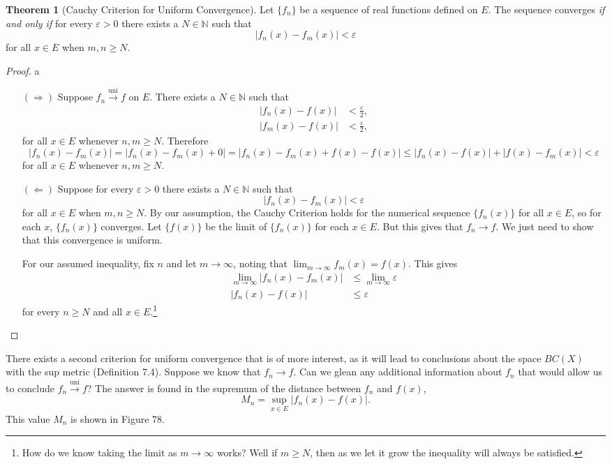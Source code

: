 \documentclass{article}
\newcommand{\N}{\mathbb{N}}
\newcommand{\uni}{\overset{\text{uni}}{\to}}
\theoremstyle{definition}
\newtheorem{theorem}{Theorem}[section]
\begin{document}
	\begin{theorem}[Cauchy Criterion for Uniform Convergence]
		Let $ \{f_n\} $ be a sequence of real functions defined on $ E $. The sequence converges \textit{if and only if} for every $ \varepsilon>0 $ there exists a $ N\in \N $ such that
		$$|f_n(x)-f_m(x)|<\varepsilon $$ for all $ x\in E $ when $ m,n\ge N $. 
	\end{theorem}
	\begin{proof}{\color{white}a}
		\begin{enumerate}
			\item [$ (\Longrightarrow) $] Suppose $ f_n\uni f $ on $ E $. There exists a $ N\in\N $ such that \begin{align*}
				|f_n(x)-f(x)|&<\frac{\varepsilon}{2},\\
				|f_m(x)-f(x)|&<\frac{\varepsilon}{2},
			\end{align*}
			for all $ x\in E $ whenever $ n,m\ge N $. Therefore $$|f_n(x)-f_m(x)|=|f_n(x)-f_m(x)+0|=|f_n(x)-f_m(x)+f(x)-f(x)|\le |f_n(x)-f(x)|+|f(x)-f_m(x)|<\varepsilon $$ for all $ x\in E $ whenever $ n,m\ge N $. 
			\item [$ (\Longleftarrow) $]  Suppose for every $ \varepsilon>0 $ there exists a $ N\in \N $ such that
			$$|f_n(x)-f_m(x)|<\varepsilon $$ for all $ x\in E $ when $ m,n\ge N $. By our assumption, the Cauchy Criterion holds for the numerical sequence $ \{f_n(x)\} $ for all $ x\in E $, so for each $ x $, $ \{f_n(x)\} $ converges. Let $ \{f(x)\} $ be the limit of $ \{f_n(x)\} $ for each $ x\in E $. But this gives that $ f_n\to f $. We just need to show that this convergence is uniform. 
			
			For our assumed inequality, fix $ n $ and let $ m\to \infty $, noting that $ \lim_{m\to \infty}f_m(x)=f(x) $. This gives 
			\begin{align*}
				\lim_{m\to\infty}|f_n(x)-f_m(x)|&\le \lim_{m\to\infty}\varepsilon\\
				|f_n(x)-f(x)|&\le \varepsilon
			\end{align*}
			for every $ n\ge N $ and all $ x\in E $.\footnote{How do we know taking the limit as $ m\to\infty $ works? Well if $ m\ge N $, then as we let it grow the inequality will always be satisfied. }
		\end{enumerate}
	\end{proof}
	There exists a second criterion for uniform convergence that is of more interest, as it will lead to conclusions about the space $ BC(X) $ with the sup metric (Definition 7.4). Suppose we know that $ f_n\to f $. Can we glean any additional information about $ f_n $ that would allow us to conclude $ f_n\uni f $? The answer is found in the supremum of the distance between $ f_n $ and $ f(x) $, $$M_n=\sup_{x\in E}|f_n(x)-f(x)| .$$ This value $ M_n $ is shown in Figure 78. 
\end{document}
